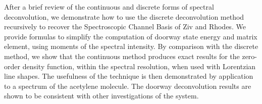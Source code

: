 After a brief review of the continuous and discrete forms of spectral
deconvolution, we demonstrate how to use the discrete deconvolution
method recursively to recover the Spectroscopic Channel Basis of Ziv
and Rhodes.  We provide formulas to simplify the computation of
doorway state energy and matrix element, using moments of the spectral
intensity.  By comparison with the discrete method, we show that the
continuous method produces exact results for the zero-order density
function, within the spectral resolution, when used with Lorentzian
line shapes.  
The usefulness of
the technique is then demonstrated by application to a spectrum of the
acetylene molecule.  The doorway deconvolution results are shown to be
consistent with other investigations of the system.

